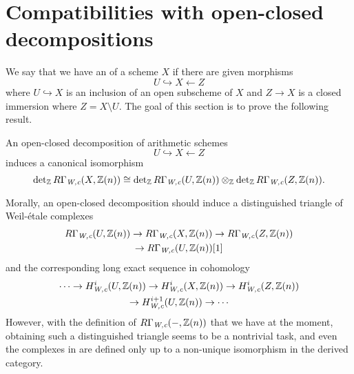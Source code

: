 
\section{Compatibilities with open-closed decompositions}
\label{section:open-closed-decompositions-for-RGammaWc}

We say that we have an  of a scheme $X$ if there
are given morphisms
$$U \hookrightarrow X \leftarrow Z$$
where $U \hookrightarrow X$ is an inclusion of an open subscheme of $X$ and
$Z \to X$ is a closed immersion where $Z = X\setminus U$. The goal of this
section is to prove the following result.

\begin{proposition}
  \label{prop:RGammaWc-determinant-iso-for-open-closed-decomposition}
  An open-closed decomposition of arithmetic schemes
  $$U \hookrightarrow X \leftarrow Z$$
  induces a canonical isomorphism
  \begin{equation}
    \label{eqn:RGammaWc-determinant-iso-for-open-closed-decomposition}
    \det\nolimits_{\mathbb{Z}} R\Gamma_\text{\it W,c} (X,\mathbb{Z}(n)) \cong
    \det\nolimits_{\mathbb{Z}} R\Gamma_\text{\it W,c} (U,\mathbb{Z}(n))
    \otimes_{\mathbb{Z}}
    \det\nolimits_{\mathbb{Z}} R\Gamma_\text{\it W,c} (Z,\mathbb{Z}(n)).
  \end{equation}

  \vspace{1em}

\end{proposition}

Morally, an open-closed decomposition should induce a distinguished triangle of
Weil-étale complexes
\begin{multline}
  \label{eqn:U-X-Z-triangle-for-RGammaWc}
  R\Gamma_\text{\it W,c} (U, \mathbb{Z} (n)) \to
  R\Gamma_\text{\it W,c} (X, \mathbb{Z} (n)) \to
  R\Gamma_\text{\it W,c} (Z, \mathbb{Z} (n)) \\
  \to R\Gamma_\text{\it W,c} (U, \mathbb{Z} (n)) [1]
\end{multline}
and the corresponding long exact sequence in cohomology
\begin{multline*}
  \cdots \to H_\text{\it W,c}^i (U, \mathbb{Z} (n)) \to
  H_\text{\it W,c}^i (X, \mathbb{Z} (n)) \to
  H_\text{\it W,c}^i (Z, \mathbb{Z} (n)) \\
  \to H_\text{\it W,c}^{i+1} (U, \mathbb{Z} (n)) \to \cdots
\end{multline*}
However, with the definition of $R\Gamma_\text{\it W,c} (-, \mathbb{Z} (n))$ that we
have at the moment, obtaining such a distinguished triangle seems to be a
nontrivial task, and even the complexes in
 are defined only up to a non-unique
isomorphism in the derived category.

